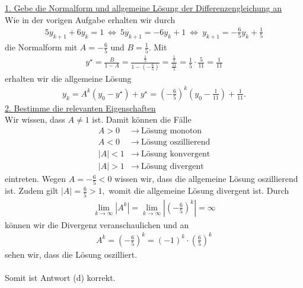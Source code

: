 \underline{1. Gebe die Normalform und allgemeine Lösung der Differenzengleichung an}\\
Wie in der vorigen Aufgabe erhalten wir durch
\begin{align*}
5 y_{k+1} + 6 y_k = 1
\ \Leftrightarrow \
5 y_{k+1} = - 6 y_k + 1
\ \Leftrightarrow \
y_{k+1} = - \frac{6}{5} y_k  + \frac{1}{5}
\end{align*}
die Normalform mit $A =  - \frac{6}{5} $ und $B = \frac{1}{5}$.
Mit 
\begin{align*}
y^\star = 
\frac{B}{1-A} 
= 
\frac{\frac{1}{5}}{1 - \left( -\frac{6}{5} \right)} 
=
\frac{\frac{1}{5}}{\frac{11}{5}}
= \frac{1}{5} \cdot \frac{5}{11} = \frac{1}{11}
\end{align*}
erhalten wir die allgemeine Lösung
\begin{align*}
y_k = A^k (y_0 - y^\star)  + y^\star
= \left( - \frac{6}{5} \right)^k \left ( y_0 - \frac{1}{11}\right) + \frac{1}{11}.
\end{align*}
\newpage
\underline{2. Bestimme die relevanten Eigenschaften}\\
Wir wissen, dass $A\neq 1$ ist.
Damit können die Fälle
\begin{align*}
A > 0 &\rightarrow \ \text{Lösung monoton}\\
A < 0 &\rightarrow \ \text{Lösung oszillierend}\\
|A| < 1  &\rightarrow \ \text{Lösung konvergent}\\
|A| > 1  &\rightarrow \ \text{Lösung divergent}
\end{align*}
eintreten.
Wegen $A = -\frac{6}{5} < 0$ wissen wir, dass die allgemeine Lösung oszillierend ist.
Zudem gilt
$
|A| = \frac{6}{5} > 1,
$
womit die allgemeine Lösung divergent ist.
Durch
\begin{align*}
\lim \limits_{k \to \infty} |A^k | 
=\lim \limits_{k \to \infty} \left| \left( - \frac{6}{5} \right)^k \right| = \infty
\end{align*}
können wir die Divergenz veranschaulichen und an
\begin{align*}
A^k = \left( - \frac{6}{5} \right)^k
= (-1)^k \cdot\left(  \frac{6}{5} \right)^k
\end{align*}
sehen wir, dass die Lösung oszilliert.
\\
\\
Somit ist Antwort (d) korrekt.

\newpage
